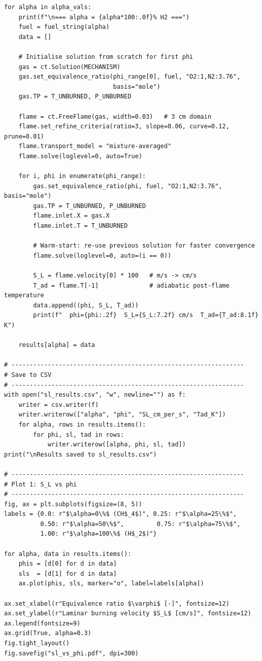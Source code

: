 \documentclass[12pt,a4paper]{article}
\begin{document}
\begin{lstlisting}[style=pythonstyle, caption={Python script for laminar burning velocity sweep using Cantera FreeFlame.}, label={lst:code}]
for alpha in alpha_vals:
    print(f"\n=== alpha = {alpha*100:.0f}% H2 ===")
    fuel = fuel_string(alpha)
    data = []

    # Initialise solution from scratch for first phi
    gas = ct.Solution(MECHANISM)
    gas.set_equivalence_ratio(phi_range[0], fuel, "O2:1,N2:3.76",
                              basis="mole")
    gas.TP = T_UNBURNED, P_UNBURNED

    flame = ct.FreeFlame(gas, width=0.03)   # 3 cm domain
    flame.set_refine_criteria(ratio=3, slope=0.06, curve=0.12, prune=0.01)
    flame.transport_model = "mixture-averaged"
    flame.solve(loglevel=0, auto=True)

    for i, phi in enumerate(phi_range):
        gas.set_equivalence_ratio(phi, fuel, "O2:1,N2:3.76", basis="mole")
        gas.TP = T_UNBURNED, P_UNBURNED
        flame.inlet.X = gas.X
        flame.inlet.T = T_UNBURNED

        # Warm-start: re-use previous solution for faster convergence
        flame.solve(loglevel=0, auto=(i == 0))

        S_L = flame.velocity[0] * 100   # m/s -> cm/s
        T_ad = flame.T[-1]              # adiabatic post-flame temperature
        data.append((phi, S_L, T_ad))
        print(f"  phi={phi:.2f}  S_L={S_L:7.2f} cm/s  T_ad={T_ad:8.1f} K")

    results[alpha] = data

# ----------------------------------------------------------------
# Save to CSV
# ----------------------------------------------------------------
with open("sl_results.csv", "w", newline="") as f:
    writer = csv.writer(f)
    writer.writerow(["alpha", "phi", "SL_cm_per_s", "Tad_K"])
    for alpha, rows in results.items():
        for phi, sl, tad in rows:
            writer.writerow([alpha, phi, sl, tad])
print("\nResults saved to sl_results.csv")

# ----------------------------------------------------------------
# Plot 1: S_L vs phi
# ----------------------------------------------------------------
fig, ax = plt.subplots(figsize=(8, 5))
labels = {0.0: r"$\alpha=0\%$ (CH$_4$)", 0.25: r"$\alpha=25\%$",
          0.50: r"$\alpha=50\%$",         0.75: r"$\alpha=75\%$",
          1.00: r"$\alpha=100\%$ (H$_2$)"}

for alpha, data in results.items():
    phis = [d[0] for d in data]
    sls  = [d[1] for d in data]
    ax.plot(phis, sls, marker="o", label=labels[alpha])

ax.set_xlabel(r"Equivalence ratio $\varphi$ [-]", fontsize=12)
ax.set_ylabel(r"Laminar burning velocity $S_L$ [cm/s]", fontsize=12)
ax.legend(fontsize=9)
ax.grid(True, alpha=0.3)
fig.tight_layout()
fig.savefig("sl_vs_phi.pdf", dpi=300)


\end{lstlisting}
\end{document}
